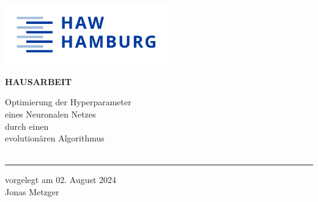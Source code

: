 \begin{titlepage}
  \color{haw}
  \raggedright
  \hfill\includegraphics[width=7cm]{HAW_Marke_RGB_300dpi}\\

  \vspace{5cm}

  \setmainfont{Open Sans}
  \small
  \textbf{HAUSARBEIT}

  \vspace{8mm}

  \begin{minipage}{0.8\linewidth}
    \setmainfont{Martel Heavy}
    \LARGE
    Optimierung der Hyperparameter\\[1mm]
    eines Neuronalen Netzes\\[1mm]
    durch einen\\[1mm]
    evolutionären Algorithmus\\
    \,\rule{11mm}{1.2mm}
  \end{minipage}

  \vspace{1cm}

  vorgelegt am 02. August 2024\\
  Jonas Metzger


\end{titlepage}
